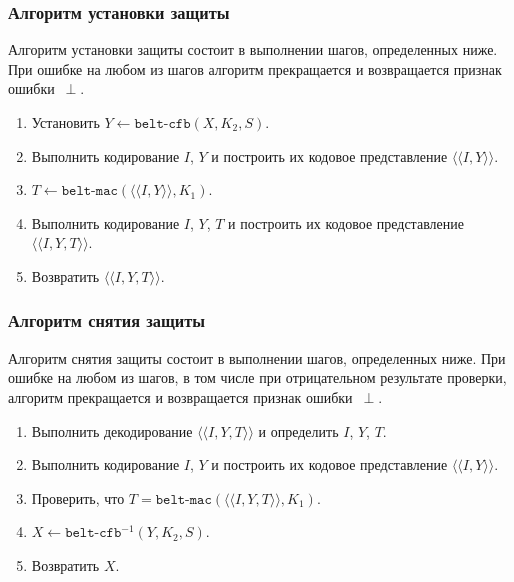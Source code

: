 \subsubsection{Алгоритм установки защиты}
\label{CRYPTO.SM.Algs.Encr}

Алгоритм установки защиты состоит в выполнении шагов, определенных ниже.
При ошибке на любом из шагов алгоритм прекращается и возвращается признак 
ошибки~$\perp$.

\begin{enumerate}
\item
Установить $Y\gets\texttt{belt-cfb}(X, K_2, S)$.

\item
Выполнить кодирование $I$, $Y$ и построить их кодовое 
представление $\langle\langle I, Y\rangle\rangle$.

\item
$T\gets\texttt{belt-mac}(\langle\langle I, Y \rangle\rangle, K_1)$.

\item
Выполнить кодирование $I$, $Y$, $T$ и построить их кодовое 
представление $\langle\langle I, Y, T \rangle\rangle$.

\item
Возвратить $\langle\langle I, Y, T \rangle\rangle$.
\end{enumerate}

\subsubsection{Алгоритм снятия защиты}
\label{CRYPTO.SM.Algs.Decr}

Алгоритм снятия защиты состоит в выполнении шагов, определенных ниже. При 
ошибке на любом из шагов, в том числе при отрицательном результате 
проверки, алгоритм прекращается и возвращается признак ошибки~$\perp$.

\begin{enumerate}
\item
Выполнить декодирование $\langle\langle I, Y, T \rangle\rangle$ 
и определить $I$, $Y$, $T$.
 
\item
Выполнить кодирование $I$, $Y$ и построить их кодовое представление 
$\langle\langle I, Y \rangle\rangle$.
 
\item
Проверить, 
что $T=\texttt{belt-mac}(\langle\langle I, Y, T\rangle\rangle, K_1)$.
 
\item
$X\leftarrow\texttt{belt-cfb}^{-1}(Y, K_2, S)$.
 
\item
Возвратить $X$.
\end{enumerate}

